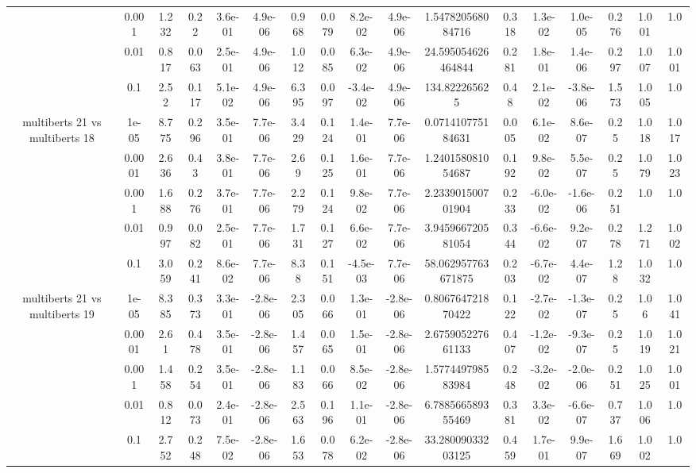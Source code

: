 \begin{tabular}{|c|c|c|c|c|c|c|c|c|c|c|c|c|c|c|c|c|}
 & 0.001 & 1.232 & 0.22 & 3.6e-01 & 4.9e-06 & 0.968 & 0.079 & 8.2e-02 & 4.9e-06 & 1.547820568084716 & 0.318 & 1.3e-02 & 1.0e-05 & 0.276 & 1.001 & 1.0 \\
 & 0.01 & 0.817 & 0.063 & 2.5e-01 & 4.9e-06 & 1.012 & 0.085 & 6.3e-02 & 4.9e-06 & 24.595054626464844 & 0.281 & 1.8e-01 & 1.4e-06 & 0.297 & 1.007 & 1.001 \\
 & 0.1 & 2.52 & 0.117 & 5.1e-02 & 4.9e-06 & 6.395 & 0.097 & -3.4e-02 & 4.9e-06 & 134.822265625 & 0.48 & 2.1e-02 & -3.8e-06 & 1.573 & 1.005 & 1.0 \\
\hline
\multirow{5}{*}{multiberts 21 vs multiberts 18} & 1e-05 & 8.775 & 0.296 & 3.5e-01 & 7.7e-06 & 3.429 & 0.124 & 1.4e-01 & 7.7e-06 & 0.071410775184631 & 0.005 & 6.1e-02 & 8.6e-07 & 0.25 & 1.018 & 1.017 \\
 & 0.0001 & 2.636 & 0.43 & 3.8e-01 & 7.7e-06 & 2.69 & 0.125 & 1.6e-01 & 7.7e-06 & 1.240158081054687 & 0.192 & 9.8e-02 & 5.5e-07 & 0.25 & 1.079 & 1.023 \\
 & 0.001 & 1.688 & 0.276 & 3.7e-01 & 7.7e-06 & 2.279 & 0.124 & 9.8e-02 & 7.7e-06 & 2.233901500701904 & 0.233 & -6.0e-02 & -1.6e-06 & 0.251 & 1.0 & 1.0 \\
 & 0.01 & 0.997 & 0.082 & 2.5e-01 & 7.7e-06 & 1.731 & 0.127 & 6.6e-02 & 7.7e-06 & 3.945966720581054 & 0.344 & -6.6e-02 & 9.2e-07 & 0.278 & 1.271 & 1.002 \\
 & 0.1 & 3.059 & 0.241 & 8.6e-02 & 7.7e-06 & 8.38 & 0.151 & -4.5e-03 & 7.7e-06 & 58.062957763671875 & 0.203 & -6.7e-02 & 4.4e-07 & 1.28 & 1.032 & 1.0 \\
\hline
\multirow{5}{*}{multiberts 21 vs multiberts 19} & 1e-05 & 8.385 & 0.373 & 3.3e-01 & -2.8e-06 & 2.305 & 0.066 & 1.3e-01 & -2.8e-06 & 0.806764721870422 & 0.122 & -2.7e-02 & -1.3e-07 & 0.25 & 1.06 & 1.041 \\
 & 0.0001 & 2.61 & 0.478 & 3.5e-01 & -2.8e-06 & 1.457 & 0.065 & 1.5e-01 & -2.8e-06 & 2.675905227661133 & 0.407 & -1.2e-02 & -9.3e-07 & 0.25 & 1.019 & 1.021 \\
 & 0.001 & 1.458 & 0.254 & 3.5e-01 & -2.8e-06 & 1.183 & 0.066 & 8.5e-02 & -2.8e-06 & 1.577449798583984 & 0.248 & -3.2e-02 & -2.0e-06 & 0.251 & 1.025 & 1.001 \\
 & 0.01 & 0.812 & 0.073 & 2.4e-01 & -2.8e-06 & 2.563 & 0.196 & 1.1e-01 & -2.8e-06 & 6.788566589355469 & 0.381 & 3.3e-02 & -6.6e-07 & 0.737 & 1.006 & 1.0 \\
 & 0.1 & 2.752 & 0.248 & 7.5e-02 & -2.8e-06 & 1.653 & 0.078 & 6.2e-02 & -2.8e-06 & 33.28009033203125 & 0.459 & 1.7e-01 & 9.9e-07 & 1.669 & 1.002 & 1.0 \\

\end{tabular}
